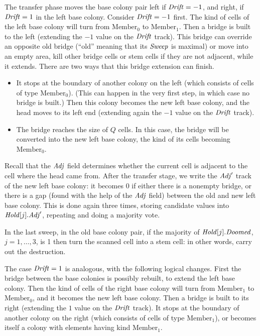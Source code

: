 \documentclass[11pt]{memoir}
\theoremstyle{definition} %
\newcommand{\fld}[1]{\ensuremath{\textit{#1\/}}}
\newcommand{\Q}{Q}
\newcommand{\Drift}{\fld{Drift}}
\newcommand{\Doomed}{\fld{Doomed}}
\newcommand{\Adj}{\fld{Adj}}
\newcommand{\cHold}{\fld{Hold}}
\newcommand{\Hold}{\fld{Hold}}
\newcommand{\Sweep}{\fld{Sweep}}
\newcommand{\Member}{\mathrm{Member}}
\begin{document}
The transfer phase moves the base colony pair left if \( \Drift=-1 \), and right, if \( \Drift=1 \)
in the left base colony.
Consider \( \Drift=-1 \) first.
The kind of cells of the left base colony will turn from \( \Member_{0} \) to \( \Member_{1} \).
Then a bridge is built to the left (extending the \( -1 \) value on the \( \Drift \) track).
This bridge can override an opposite old bridge (``old'' meaning 
that its \( \Sweep \) is maximal) or move 
into an empty area, kill other bridge cells or stem cells if they are not adjacent, while it extends.
There are two ways that this bridge extension can finish.
\begin{itemize}
\item It stops at the boundary of another colony on the left
  (which consists of cells of type \( \Member_{0} \)).
  (This can happen in the very first step, in which case no bridge is built.)
  Then this colony becomes the new left base colony, and the head moves to its left end
  (extending again the \( -1 \) value on the \( \Drift \)  track).
  
\item The bridge reaches the size of \( \Q \) cells.
  In this case, the bridge will be converted into the new left base colony, the kind of its cells
  becoming \( \Member_{0} \).
  \end{itemize}
Recall that the \( \Adj \) field determines
whether the current cell is adjacent to the cell  where the head came from.
After the transfer stage, we write the \( \Adj' \) track of the
new left base colony: it becomes \( 0 \) if either there is a nonempty bridge,
or there is a gap (found with the help of the \( \Adj \) field) between the old and new left base colony.
This is done again three times, storing candidate values into \( \Hold[j].\Adj' \),
repeating and doing a majority vote.

\begin{sloppypar}
In the last sweep, 
in the old base colony pair, if the majority of \( \cHold[j].\Doomed \), \( j=1,\dots,3 \), 
is 1 then turn the scanned cell into a stem cell: 
in other words, carry out the destruction.
\end{sloppypar}

The case \( \Drift=1 \) is analogous, with the following logical changes.
First the bridge between the base colonies is possibly rebuilt, to extend the left base colony.
Then the kind of cells of the right base colony will turn from \( \Member_{1} \)
to \( \Member_{0} \), and it becomes the new left base colony.
Then a bridge is built to its right (extending the \( 1 \) value on the \( \Drift \) track).
It stops at the boundary of another colony on the right
(which consists of cells of type \( \Member_{1} \)), or becomes itself a colony with elements having
kind \( \Member_{1} \).
\end{document}
